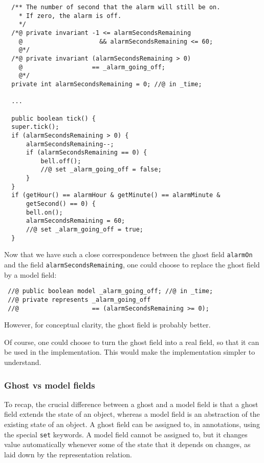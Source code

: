 \documentclass{llncs}
\begin{document}
\begin{verbatim}
  /** The number of second that the alarm will still be on.
    * If zero, the alarm is off.
    */
  /*@ private invariant -1 <= alarmSecondsRemaining 
    @                     && alarmSecondsRemaining <= 60;
    @*/
  /*@ private invariant (alarmSecondsRemaining > 0)
    @                   == _alarm_going_off;
    @*/
  private int alarmSecondsRemaining = 0; //@ in _time;

  ...

  public boolean tick() {
  super.tick();
  if (alarmSecondsRemaining > 0) {
      alarmSecondsRemaining--;
      if (alarmSecondsRemaining == 0) {
          bell.off();
          //@ set _alarm_going_off = false;
      }
  }
  if (getHour() == alarmHour & getMinute() == alarmMinute &
      getSecond() == 0) {
      bell.on();
      alarmSecondsRemaining = 60;
      //@ set _alarm_going_off = true;
  }
\end{verbatim}
Now that we have such a close correspondence between the
ghost field \texttt{alarmOn} and the field
\texttt{alarmSecondsRemaining}, one could choose to replace
the ghost field by a model field:
\begin{verbatim}
 //@ public boolean model _alarm_going_off; //@ in _time;
 //@ private represents _alarm_going_off 
 //@                    == (alarmSecondsRemaining >= 0);
\end{verbatim}
However, for conceptual clarity, the ghost field is probably better.

Of course, one could choose to turn the ghost field into a real field,
so that it can be used in the implementation.
This would make the implementation simpler to understand.

\subsubsection*{Ghost vs model fields}

To recap, the crucial difference between a ghost and a model field 
is that a ghost field extends the state of an object, whereas
a model field is an abstraction of the existing state of an object.
A ghost field can be assigned to, in annotations, using the
special \texttt{set} keywords.
A model field cannot be assigned to, but it changes value automatically
whenever some of the state that it depends on changes, as laid down
by the representation relation.

% 
% 
% 
\end{document}
